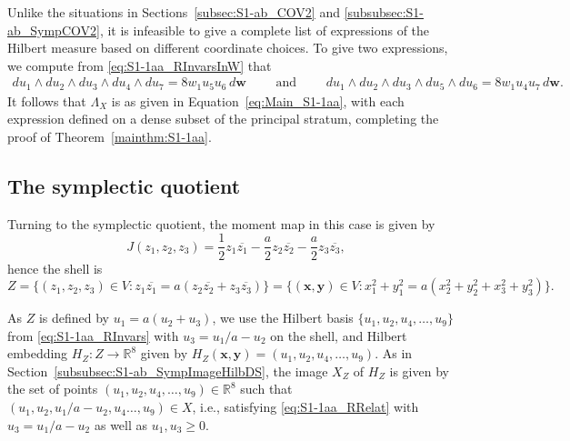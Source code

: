 \documentclass[twoside]{amsart}
\theoremstyle{definition}
\theoremstyle{remark}
\numberwithin{equation}{section}
\newcommand{\R}{\mathbb{R}}
\begin{document}
Unlike the situations in Sections~\ref{subsec:S1-ab_COV2} and \ref{subsubsec:S1-ab_SympCOV2}, it is infeasible to give a
complete list of expressions of the Hilbert measure based on different coordinate choices. To give two expressions,
we compute from \eqref{eq:S1-1aa_RInvarsInW} that
\begin{align*}
    du_1\wedge du_2 \wedge du_3 \wedge du_4 \wedge du_7
    =      8 w_1 u_5 u_6 \, d\mathbf{w}
    \qquad\text{ and }\qquad
    du_1\wedge du_2 \wedge du_3 \wedge du_5 \wedge du_6
    =      8 w_1 u_4 u_7 \, d\mathbf{w}.
\end{align*}
It follows that $\Lambda_X$ is as given in Equation~\eqref{eq:Main_S1-1aa}, with each expression defined on a dense subset of the principal stratum,
completing the proof of Theorem~\ref{mainthm:S1-1aa}.


\subsection{The symplectic quotient}
\label{subsec:S1-1aa_Symp}

Turning to the symplectic quotient, the moment map in this case is given by
\[
    J(z_1, z_2, z_3) = \frac{1}{2}z_1\overline{z_1} - \frac{a}{2} z_2 \overline{z_2}  - \frac{a}{2} z_3 \overline{z_3},
\]
hence the shell is
\begin{equation}
\label{eq:S1-1aa_SympShell}
    Z   =   \{ (z_1, z_2, z_3) \in V : z_1\overline{z_1} = a (z_2\overline{z_2} + z_3\overline{z_3}) \}
        =   \{ (\mathbf{x}, \mathbf{y}) \in V : x_1^2 + y_1^2 = a (x_2^2 + y_2^2 + x_3^2 + y_3^2) \}.
\end{equation}

As $Z$ is defined by $u_1 = a(u_2 + u_3)$, we use the Hilbert basis $\{ u_1, u_2, u_4, \ldots, u_9 \}$ from \eqref{eq:S1-1aa_RInvars}
with $u_3 = u_1/a - u_2$ on the shell, and Hilbert embedding $H_Z\colon Z\to\R^8$ given by $H_Z(\mathbf{x}, \mathbf{y}) = (u_1, u_2, u_4, \ldots, u_9)$.
As in Section~\ref{subsubsec:S1-ab_SympImageHilbDS}, the image $X_Z$ of $H_Z$ is given by the set of points $(u_1, u_2, u_4, \ldots, u_9)\in\R^8$
such that $(u_1, u_2, u_1/a - u_2, u_4 \ldots,u_9)\in X$, i.e., satisfying \eqref{eq:S1-1aa_RRelat} with $u_3 = u_1/a - u_2$ as well as $u_1, u_3 \geq 0$.
\end{document}
